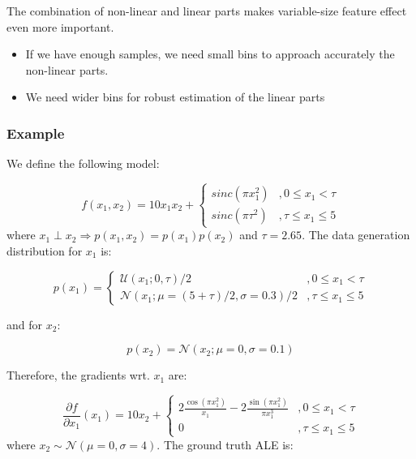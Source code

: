 \documentclass{article}
\begin{document}
The combination of non-linear and linear parts makes variable-size
feature effect even more important.

\begin{itemize}
\item If we have enough samples, we need small bins to approach
  accurately the non-linear parts.
\item We need wider bins for robust estimation of the linear parts
\end{itemize}

\subsubsection*{Example}

We define the following model:

\begin{equation} \label{eq:bullet-4-model}
  f(x_1, x_2) = 10x_1x_2 +
  \begin{cases}
    sinc(\pi x_1^2)  &,  0  \leq x_1 < \tau \\
    sinc(\pi \tau^2) &, \tau \leq x_1 \leq 5
  \end{cases}
\end{equation}
%
where \(x_1 \perp x_2 \Rightarrow p(x_1, x_2) = p(x_1)p(x_2)\) and \(\tau = 2.65\). The data generation distribution for \(x_1\) is:

\begin{equation} \label{eq:bullet-4-generative-x-1}
  p(x_1) =
  \begin{cases}
    \mathcal{U}(x_1; 0 , \tau)/2  &,  0  \leq x_1 < \tau \\
    \mathcal{N}(x_1; \mu = (5 + \tau)/2 , \sigma=0.3)/2 &, \tau \leq x_1 \leq 5
  \end{cases}
\end{equation}

and for \(x_2\):

\begin{equation} \label{eq:bullet-4-generative-x-2}
  p(x_2) = \mathcal{N}(x_2; \mu = 0 , \sigma=0.1)
\end{equation}

Therefore, the gradients wrt. \(x_1\) are:

\begin{equation} \label{eq:bullet-4-data-effect}
  \frac{\partial f}{ \partial x_1} (x_1) = 10x_2 +
  \begin{cases}
    2 \frac{\cos(\pi x_1^2)}{x_1} - 2 \frac{\sin(\pi x_1^2)}{\pi x_1^3}  &,  0  \leq x_1 < \tau \\
    0   &, \tau \leq x_1 \leq 5
  \end{cases}
\end{equation}
%
where \(x_2 \sim \mathcal{N}(\mu=0, \sigma=4)\). The ground truth ALE is:
\end{document}
